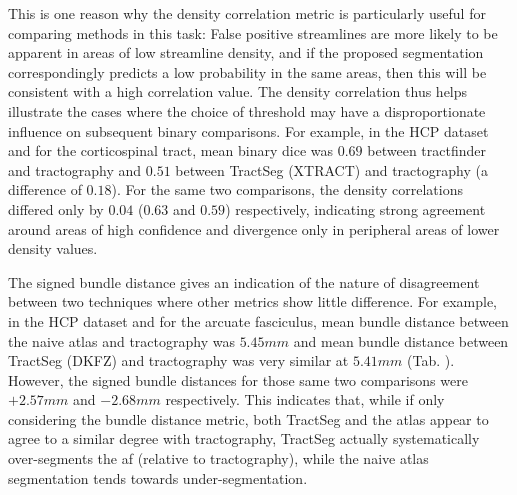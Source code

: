 This is one reason why the density correlation metric is particularly useful for comparing methods in this task:
False positive streamlines are more likely to be apparent in areas of low streamline density, and if the proposed segmentation correspondingly predicts a low probability in the same areas, then this will be consistent with a high correlation value.
The density correlation thus helps illustrate the cases where the choice of threshold may have a disproportionate influence on subsequent binary comparisons.
For example, in the HCP dataset and for the corticospinal tract, mean binary \gls{dice} was $0.69$ between tractfinder and tractography and $0.51$ between TractSeg (XTRACT) and tractography (a difference of $0.18$).
For the same two comparisons, the density correlations differed only by $0.04$ ($0.63$ and $0.59$) respectively, indicating strong agreement around areas of high confidence and divergence only in peripheral areas of lower density values.


The signed bundle distance gives an indication of the nature of disagreement between two techniques where other metrics show little difference.
For example, in the HCP dataset and for the arcuate fasciculus, mean bundle distance between the naive atlas and tractography was $5.45 mm$ and mean bundle distance between TractSeg (DKFZ) and tractography was very similar at $5.41 mm$ (Tab. ).
However, the signed bundle distances for those same two comparisons were $+2.57 mm$ and $-2.68 mm$ respectively.
This indicates that, while if only considering the bundle distance metric, both TractSeg and the atlas appear to agree to a similar degree with tractography, TractSeg actually systematically over-segments the \gls{af} (relative to tractography), while the naive atlas segmentation tends towards under-segmentation.

